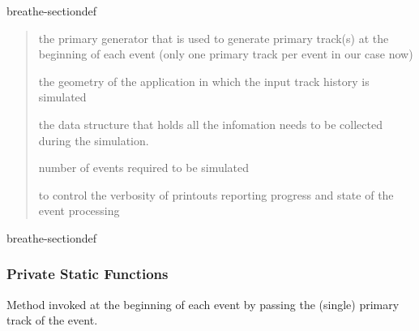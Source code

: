 \documentclass[letterpaper,10pt,english]{sphinxmanual}
\begin{document}
\begin{fulllineitems}
\begin{sphinxuseclass}{breathe-sectiondef}
\begin{fulllineitems}
\begin{quote}
\begin{description}
\sphinxAtStartPar
the primary generator that is used to generate primary track(s) at the beginning of each event (only one primary track per event in our case now) 

\sphinxAtStartPar
the geometry of the application in which the input track history is simulated 

\sphinxAtStartPar
the data structure that holds all the infomation needs to be collected during the simulation. 

\sphinxAtStartPar
number of events required to be simulated 

\sphinxAtStartPar
to control the verbosity of printouts reporting progress and state of the event processing 

\end{description}\end{quote}


\end{fulllineitems}


\end{sphinxuseclass}
\begin{sphinxuseclass}{breathe-sectiondef}\subsubsection*{Private Static Functions}

\begin{fulllineitems}
\label{\detokenize{Simulation/SimulationCodeDoc:_CPPv4N9EventLoop18BeginOfEventActionER7ResultsiRK12G4HepEmTrack}}
\pysigstartsignatures
\pysigstartmultiline
{}
\pysigstopmultiline
\pysigstopsignatures
\sphinxAtStartPar
Method invoked at the beginning of each event by passing the (single) primary track of the event. 


\end{fulllineitems}
\end{sphinxuseclass}
\end{fulllineitems}
\end{document}
